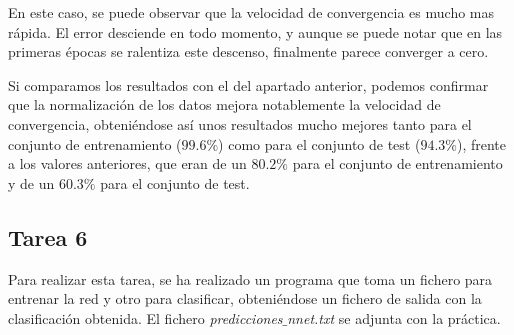 \documentclass[spanish]{assignment}
\begin{document}
	En este caso, se puede observar que la velocidad de convergencia es mucho mas rápida. El error desciende en todo momento, y aunque se puede notar que en las primeras épocas se ralentiza este descenso, finalmente parece converger a cero. 
	
	Si comparamos los resultados con el del apartado anterior, podemos confirmar que la normalización de los datos mejora notablemente la velocidad de convergencia, obteniéndose así unos resultados mucho mejores tanto para el conjunto de entrenamiento ($99.6\%$) como para el conjunto de test ($94.3\%$), frente a los valores anteriores, que eran de un $80.2\%$ para el conjunto de entrenamiento y de un $60.3\%$ para el conjunto de test.
	
	\subsection{Tarea 6}
	Para realizar esta tarea, se ha realizado un programa que toma un fichero para entrenar la red y otro para clasificar, obteniéndose un fichero de salida con la clasificación obtenida. El fichero \textit{predicciones$\_$nnet.txt} se adjunta con la práctica.
	
\end{document}
